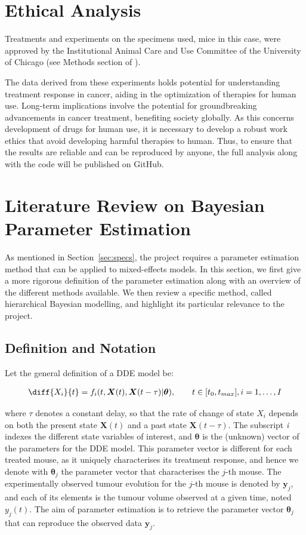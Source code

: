 \documentclass[11pt]{article}
\begin{document}
\section{Ethical Analysis}

Treatments and experiments on the specimens used, mice in this case, were approved by the Institutional Animal Care and Use Committee of the University of Chicago (see Methods section of \cite{cbdil12}).

The data derived from these experiments holds potential for understanding treatment response in cancer, aiding in the optimization of therapies for human use. Long-term implications involve the potential for groundbreaking advancements in cancer treatment, benefiting society globally. As this concerns development of drugs for human use, it is necessary to develop a robust work ethics that avoid developing harmful therapies to human. Thus, to ensure that the results are reliable and can be reproduced by anyone, the full analysis along with the code will be published on GitHub.

\section{Literature Review on Bayesian Parameter Estimation}\label{sec:littrev}

As mentioned in Section~\ref{sec:specs}, the project requires a parameter estimation method that can be applied to mixed-effects models. In this section, we first give a more rigorous definition of the parameter estimation along with an overview of the different methods available. We then review a specific method, called hierarchical Bayesian modelling, and highlight its particular relevance to the project. 

\subsection{Definition and Notation}
Let the general definition of a DDE model be: 

\begin{align*}
    \diff{X_i}{t} = f_i(t, \boldsymbol{X}(t), \boldsymbol{X}(t-\tau)| \boldsymbol{\theta}), \qquad t \in [t_0, t_{max}], i = 1, \ldots, I
\end{align*}

where $\tau$ denotes a constant delay, so that the rate of change of state $X_i$ depends on both the present state $\boldsymbol{X}(t)$ and a past state $\boldsymbol{X}(t-\tau)$. The subscript \textit{i} indexes the different state variables of interest, and $\boldsymbol{\theta}$ is the (unknown) vector of the parameters for the DDE model. This parameter vector is different for each treated mouse, as it uniquely characterises its treatment response, and hence we denote with $\boldsymbol{\theta}_j$ the parameter vector that characterises the $j$-th mouse. The experimentally observed tumour evolution for the $j$-th mouse is denoted by $\boldsymbol{y}_j$, and each of its elements is the tumour volume observed at a given time, noted $y_{j}(t)$. The aim of parameter estimation is to retrieve the parameter vector $\boldsymbol{\theta}_j$ that can reproduce the observed data $\boldsymbol{y}_j$. 
\end{document}

